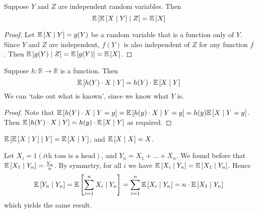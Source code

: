 \begin{proposition}
	Suppose \(Y\) and \(Z\) are independent random variables.
	Then
	\[
		\mathbb{E}\left[{\mathbb{E}\left[{X \mid Y}\right] \mid Z}\right] = \mathbb{E}\left[{X}\right]
	\]
\end{proposition}
\begin{proof}
	Let \(\mathbb{E}\left[{X \mid Y}\right] = g(Y)\) be a random variable that is a function only of \(Y\).
	Since \(Y\) and \(Z\) are independent, \(f(Y)\) is also independent of \(Z\) for any function \(f\).
	Then \(\mathbb{E}\left[{g(Y) \mid Z}\right] = \mathbb{E}\left[{g(Y)}\right] = \mathbb{E}\left[{X}\right]\).
\end{proof}
\begin{proposition}
	Suppose \(h \colon \mathbb R \to \mathbb R\) is a function.
	Then
	\[
		\mathbb{E}\left[{h(Y) \cdot X \mid Y}\right] = h(Y) \cdot \mathbb{E}\left[{X \mid Y}\right]
	\]
	We can `take out what is known', since we know what \(Y\) is.
\end{proposition}
\begin{proof}
	Note that \(\mathbb{E}\left[{h(Y) \cdot X \mid Y = y}\right] = \mathbb{E}\left[{h(y) \cdot X \mid Y = y}\right] = h(y) \mathbb{E}\left[{X \mid Y = y}\right]\).
	Then \(\mathbb{E}\left[{h(Y) \cdot X \mid Y}\right] = h(y) \cdot \mathbb{E}\left[{X \mid Y}\right]\) as required.
\end{proof}
\begin{corollary}
	\(\mathbb{E}\left[{\mathbb{E}\left[{X \mid Y}\right] \mid Y}\right] = \mathbb{E}\left[{X \mid Y}\right]\), and \(\mathbb{E}\left[{X \mid X}\right] = X\).
\end{corollary}
\noindent Let \(X_i = 1(i\text{th toss is a head})\), and \(Y_n = X_1 + \dots + X_n\).
We found before that \(\mathbb{E}\left[{X_1 \mid Y_n}\right] = \frac{Y_n}{n}\).
By symmetry, for all \(i\) we have \(\mathbb{E}\left[{X_i \mid Y_n}\right] = \mathbb{E}\left[{X_1 \mid Y_n}\right]\).
Hence
\[
	\mathbb{E}\left[{Y_n \mid Y_n}\right] = \mathbb{E}\left[{\sum_{i=1}^n X_i \mid Y_n}\right] = \sum_{i=1}^n \mathbb{E}\left[{X_i \mid Y_n}\right] = n \cdot \mathbb{E}\left[{X_1 \mid Y_n}\right]
\]
which yields the same result.
